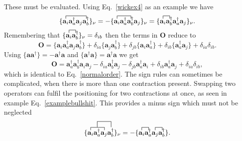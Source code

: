 \documentclass[a4paper,norsk,11pt,twoside]{report}
\begin{document}
These must be evaluated. Using Eq.~\eqref{wickex4} as an example we have
\begin{equation}
\{
\contraction{}{\textbf{a}_i}{\textbf{a}^{\dag}_a \textbf{a}_j}{\textbf{a}^{\dag}_b}
\textbf{a}_i \textbf{a}^{\dag}_a \textbf{a}_j \textbf{a}^{\dag}_b
\}_{\nu}
= - \{
\contraction{}{\textbf{a}_i}{\textbf{a}^{\dag}_a}{\textbf{a}^{\dag}_b}
\textbf{a}_i \textbf{a}^{\dag}_a \textbf{a}^{\dag}_b 
\textbf{a}_j 
\}_{\nu}
= \{
\contraction{}{\textbf{a}_i}{}{\textbf{a}^{\dag}_b}
\textbf{a}_i  \textbf{a}^{\dag}_b 
\textbf{a}^{\dag}_a \textbf{a}_j 
\}_{\nu} . \label{wikssign}
\end{equation}
Remembering that $\{\contraction{}{\textbf{a}_i}{}{\textbf{a}^{\dag}_b}
\textbf{a}_i  \textbf{a}^{\dag}_b \}_{\nu} = \delta_{ib}$ then the terms in $\textbf{O}$ reduce to
\begin{equation}
\textbf{O} =  \{ 
\textbf{a}_i \textbf{a}^{\dag}_a
\textbf{a}_j \textbf{a}^{\dag}_b
\} +
\delta_{ia} \{
\textbf{a}_j \textbf{a}^{\dag}_b
\} +
\delta_{jb} \{
\textbf{a}_i \textbf{a}^{\dag}_a
\} +
\delta_{ib} \{
\textbf{a}^{\dag}_a \textbf{a}_j
\} +
\delta_{ia} \delta_{ib} . 
\end{equation}
Using $\{
\textbf{a} \textbf{a}^{\dag}
\} = -\textbf{a}^{\dag} \textbf{a}$ and $\{
\textbf{a}^{\dag} \textbf{a} 
\} = \textbf{a}^{\dag} \textbf{a}$ we get
\begin{equation}
\textbf{O} = 
\textbf{a}^{\dag}_a \textbf{a}^{\dag}_b
\textbf{a}_i \textbf{a}_j  
- \delta_{ia} \textbf{a}^{\dag}_b \textbf{a}_j
- \delta_{jb} \textbf{a}^{\dag}_a \textbf{a}_i
+ \delta_{ib} \textbf{a}^{\dag}_a \textbf{a}_j 
+ \delta_{ia} \delta_{ib} ,
\end{equation}
which is identical to Eq.~\eqref{normalorder}. The sign rules can
sometimes be complicated, when there is more than one contraction
present. Swapping two operators can fulfil the positioning for two
contractions at once, as seen in example
Eq.~\eqref{examplebullshit}. This provides a minus sign which must not
be neglected
\begin{equation}
\{
\contraction{}{\textbf{a}_i}{\textbf{a}^{\dag}_a}{\textbf{a}_j}
\contraction[2ex]{\textbf{a}_i}{\textbf{a}^{\dag}_a}{\textbf{a}_j}{\textbf{a}^{\dag}_b}
\textbf{a}_i \textbf{a}^{\dag}_a \textbf{a}_j \textbf{a}^{\dag}_b
\}_{\nu}
= - \{
\contraction{}{\textbf{a}_i}{}{\textbf{a}^{\dag}_a}
\contraction{\textbf{a}_i \textbf{a}^{\dag}_a}{\textbf{a}_j}{}{\textbf{a}^{\dag}_b}
\textbf{a}_i \textbf{a}^{\dag}_a \textbf{a}_j \textbf{a}^{\dag}_b
\} . \label{examplebullshit}
\end{equation}
\end{document}
